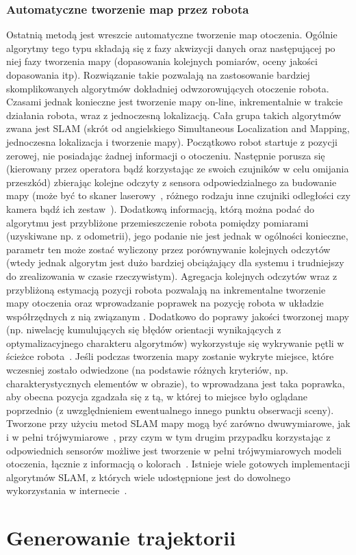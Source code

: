 \subsubsection{Automatyczne tworzenie map przez robota}

Ostatnią metodą jest wreszcie automatyczne tworzenie map otoczenia. Ogólnie
algorytmy tego typu składają się z fazy akwizycji danych oraz następującej
po niej fazy tworzenia mapy (dopasowania kolejnych pomiarów, oceny jakości
dopasowania itp). Rozwiązanie takie pozwalają na zastosowanie bardziej skomplikowanych
algorytmów dokładniej odwzorowujących otoczenie robota. Czasami jednak konieczne
jest tworzenie mapy on-line, inkrementalnie w trakcie działania robota,
wraz z jednoczesną lokalizacją. Cała grupa takich algorytmów zwana jest SLAM
(skrót od angielskiego Simultaneous Localization and Mapping, jednoczesna
lokalizacja i tworzenie mapy). Początkowo robot startuje z pozycji zerowej,
nie posiadając żadnej informacji o otoczeniu. Następnie porusza się (kierowany przez
operatora bądź korzystając ze swoich czujników w celu omijania przeszkód) zbierając
kolejne odczyty z sensora odpowiedzialnego za budowanie mapy (może być to skaner laserowy~\cite{laser_slam},
różnego rodzaju inne czujniki odległości czy kamera bądź ich zestaw~\cite{vslam}). Dodatkową
informacją, którą można podać do algorytmu jest przybliżone przemieszczenie robota
pomiędzy pomiarami (uzyskiwane np. z odometrii), jego podanie nie jest jednak w ogólności
konieczne, parametr ten może zostać wyliczony przez porównywanie kolejnych odczytów
(wtedy jednak algorytm jest dużo bardziej obciążający dla systemu i trudniejszy do zrealizowania
w czasie rzeczywistym). Agregacja kolejnych odczytów wraz z przybliżoną estymacją
pozycji robota pozwalają na inkrementalne tworzenie mapy otoczenia oraz wprowadzanie
poprawek na pozycję robota w układzie współrzędnych z nią związanym \cite{Dissanayake01asolution}.
Dodatkowo do poprawy jakości tworzonej mapy (np. niwelację kumulujących się błędów orientacji
wynikających z optymalizacyjnego charakteru algorytmów) wykorzystuje się wykrywanie pętli
w ścieżce robota~\cite{slam-loop}. Jeśli podczas tworzenia mapy zostanie wykryte
miejsce, które wczesniej zostało odwiedzone (na podstawie różnych kryteriów, np. charakterystycznych
elementów w obrazie), to wprowadzana jest taka poprawka, aby obecna pozycja zgadzała się
z tą, w której to miejsce było oglądane poprzednio (z uwzględnieniem ewentualnego
innego punktu obserwacji sceny). Tworzone przy użyciu metod SLAM mapy mogą być zarówno
dwuwymiarowe, jak i w pełni trójwymiarowe~\cite{6dslam}, przy czym w tym drugim przypadku
korzystając z odpowiednich sensorów możliwe jest tworzenie w pełni trójwymiarowych
modeli otoczenia, łącznie z informacją o kolorach~\cite{kinect_slam}.
Istnieje wiele gotowych implementacji algorytmów SLAM, z których wiele udostępnione
jest do dowolnego wykorzystania w internecie~\cite{openslam}.

\section{Generowanie trajektorii}

